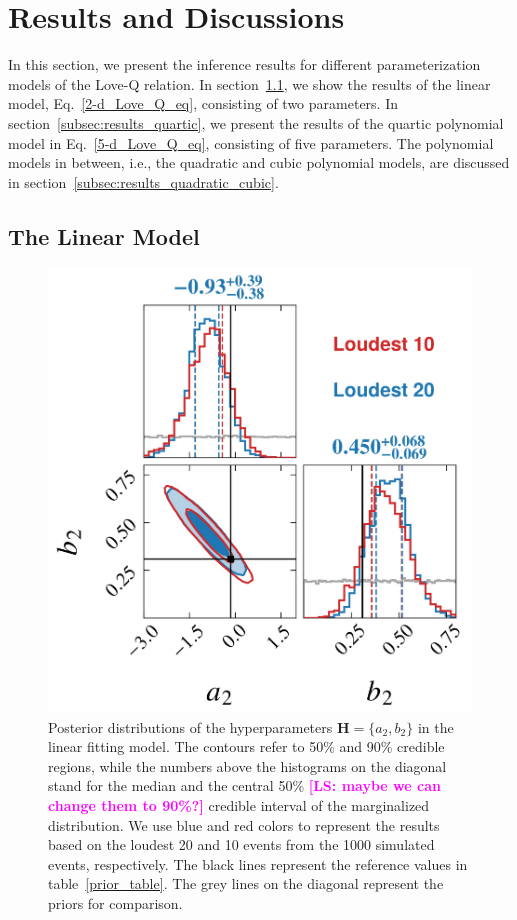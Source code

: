 \documentclass[a4paper,11pt]{article}
\newcommand{\LS}[1]{\textcolor{magenta}{\bf #1}}
\begin{document}
\section{Results and Discussions}
\label{sec:results}

In this section, we present the inference results for different parameterization
models of the Love-Q relation. In section~\ref{subsec:results_linear_model}, we 
show the results of the linear model, Eq.~\eqref{2-d_Love_Q_eq}, consisting of
two parameters.  In section~\ref{subsec:results_quartic}, we present the results
of the quartic polynomial model in Eq.~\eqref{5-d_Love_Q_eq}, consisting of five
parameters. The polynomial models in between, i.e., the quadratic and cubic
polynomial models, are discussed in
section~\ref{subsec:results_quadratic_cubic}.

\subsection{The Linear Model}
\label{subsec:results_linear_model}

\begin{figure}[t]
    \centering
    \includegraphics[width=0.5\linewidth]{fig_comparison_corner_plot.pdf}
    \caption{Posterior distributions of the hyperparameters ${\bm H} =
    \{a_2,b_2\}$ in the linear fitting model. The contours refer to 50\% and
    90\% credible regions, while the numbers above the histograms on the
    diagonal stand for the median and the central 50\% \LS{[LS: maybe we can
    change them to 90\%?]} credible interval of the marginalized distribution.
    We use blue and red colors to represent the results based on the loudest 20
    and 10 events from the 1000 simulated events, respectively.  The black lines
    represent the reference values in table~\ref{prior_table}.  The grey lines
    on the diagonal represent the priors for comparison.}
    \label{corner2-d}
\end{figure}
\end{document}
